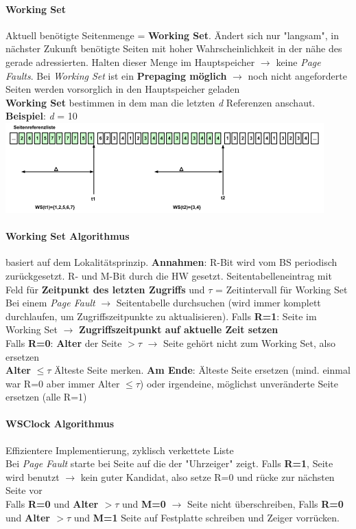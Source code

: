 \documentclass[11pt,a4paper,landscape]{article}
\begin{document}
\begin{multicols*}{3}
	\paragraph{Working Set} Aktuell benötigte Seitenmenge = \textbf{Working Set}. Ändert sich nur "langsam", in nächster Zukunft benötigte Seiten mit hoher Wahrscheinlichkeit in der nähe des gerade adressierten. Halten dieser Menge im Hauptspeicher $\rightarrow$ keine \textit{Page Faults}. Bei \textit{Working Set} ist ein \textbf{Prepaging möglich} $\rightarrow$ noch nicht angeforderte Seiten werden vorsorglich in den Hauptspeicher geladen\\
	\textbf{Working Set} bestimmen in dem man die letzten \textit{d} Referenzen anschaut. \textbf{Beispiel}: \textit{d} = 10\\
	\includegraphics[width=1\columnwidth]{workingSet}
	\paragraph{Working Set Algorithmus} basiert auf dem Lokalitätsprinzip. \textbf{Annahmen}: R-Bit wird vom BS periodisch zurückgesetzt. R- und M-Bit durch die HW gesetzt. Seitentabelleneintrag mit Feld für \textbf{Zeitpunkt des letzten Zugriffs} und $\tau$ = Zeitintervall für Working Set\\ Bei einem \textit{Page Fault} $\rightarrow$ Seitentabelle durchsuchen (wird immer komplett durchlaufen, um Zugriffszeitpunkte zu aktualisieren). Falls \textbf{R=1}: Seite im Working Set $\rightarrow$ \textbf{Zugriffszeitpunkt auf aktuelle Zeit setzen}\\ Falls \textbf{R=0}: \textbf{Alter} der Seite $> \tau$ $\rightarrow$ Seite gehört nicht zum Working Set, also ersetzen\\ \textbf{Alter} $\leq \tau$ Älteste Seite merken. \textbf{Am Ende}: Älteste Seite ersetzen (mind. einmal war R=0 aber immer Alter $\leq \tau$) oder irgendeine, möglichst unveränderte Seite ersetzen (alle R=1)
	\paragraph{WSClock Algorithmus} Effizientere Implementierung, zyklisch verkettete Liste\\
	Bei \textit{Page Fault} starte bei Seite auf die der "Uhrzeiger" zeigt. Falls \textbf{R=1}, Seite wird benutzt $\rightarrow$ kein guter Kandidat, also setze R=0 und rücke zur nächsten Seite vor \\
	Falls \textbf{R=0} und \textbf{Alter $>\tau$} und \textbf{M=0} $\rightarrow$ Seite nicht überschreiben, Falls \textbf{R=0} und \textbf{Alter $>\tau$} und \textbf{M=1} Seite auf Festplatte schreiben und Zeiger vorrücken.

\end{multicols*}
\end{document}
